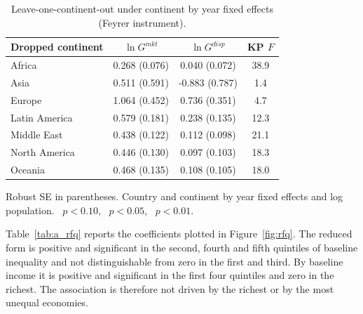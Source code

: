 \begin{table}[H]\centering\caption{Leave-one-continent-out under continent by year fixed effects (Feyrer instrument).}\label{tab:a_loocy}
\begin{threeparttable}\small\begin{tabular}{lccc}
\toprule
Dropped continent & $\ln G^{mkt}$ & $\ln G^{disp}$ & KP $F$ \\
\midrule
Africa & 0.268\sym{***} (0.076) & 0.040 (0.072) & 38.9 \\
Asia & 0.511 (0.591) & -0.883 (0.787) & 1.4 \\
Europe & 1.064\sym{**} (0.452) & 0.736\sym{**} (0.351) & 4.7 \\
Latin America & 0.579\sym{***} (0.181) & 0.238\sym{*} (0.135) & 12.3 \\
Middle East & 0.438\sym{***} (0.122) & 0.112 (0.098) & 21.1 \\
North America & 0.446\sym{***} (0.130) & 0.097 (0.103) & 18.3 \\
Oceania & 0.468\sym{***} (0.135) & 0.108 (0.105) & 18.0 \\
\bottomrule
\end{tabular}
\begin{tablenotes}\footnotesize\item Robust SE in parentheses. Country and continent by year fixed effects and log population. \sym{*}~$p<0.10$, \sym{**}~$p<0.05$, \sym{***}~$p<0.01$.\end{tablenotes}\end{threeparttable}\end{table}

Table~\ref{tab:a_rfq} reports the coefficients plotted in Figure~\ref{fig:rfq}. The reduced form is positive and significant in the second, fourth and fifth quintiles of baseline inequality and not distinguishable from zero in the first and third. By baseline income it is positive and significant in the first four quintiles and zero in the richest. The association is therefore not driven by the richest or by the most unequal economies.

